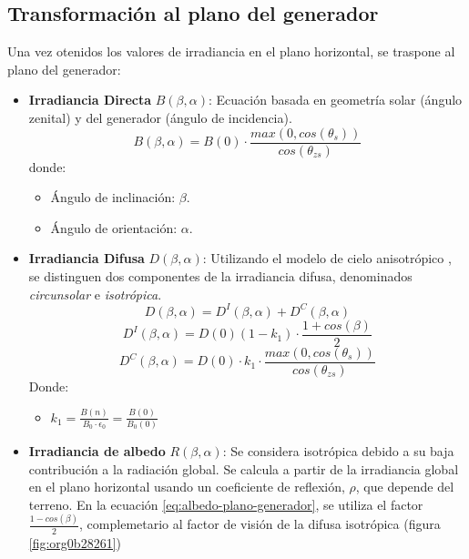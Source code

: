 \subsection{Transformación al plano del generador}
\label{sec:orge6ffc3c}
\label{subsec:transformación-plano-generador}
Una vez otenidos los valores de irradiancia en el plano horizontal, se traspone al plano del generador:
\begin{itemize}
\item \textbf{Irradiancia Directa} \(B(\beta ,\alpha)\): Ecuación basada en geometría solar (ángulo zenital) y del generador (ángulo de incidencia).
\begin{equation}
B(\beta ,\alpha)=B(0)\cdot \frac{max(0,cos(\theta_s))}{cos(\theta_{zs})}
\label{eq:irradiancia-directa-plano-generador}
\end{equation}
donde:
\begin{itemize}
\item Ángulo de inclinación: \(\beta\).
\item Ángulo de orientación: \(\alpha\). 
\end{itemize}
\item \textbf{Irradiancia Difusa} \(D(\beta ,\alpha)\): Utilizando el modelo de cielo anisotrópico \cite{Perpinan2023}, se distinguen dos componentes de la irradiancia difusa, denominados \emph{circunsolar} e \emph{isotrópica}.  
\begin{equation}
D(\beta ,\alpha)=D^I(\beta ,\alpha)+D^C(\beta ,\alpha)
\end{equation}
\begin{equation}
D^I(\beta ,\alpha)=D(0)(1-k_1)\cdot \frac{1+cos(\beta)}{2}
\end{equation}
\begin{equation}
D^C(\beta, \alpha)=D(0)\cdot k_1\cdot \frac{max(0,cos(\theta_s))}{cos(\theta_{zs})}
\end{equation}
Donde:
\begin{itemize}
\item \(k_1=\frac{B(n)}{B_0\cdot \epsilon_0}=\frac{B(0)}{B_0(0)}\)
\end{itemize}
\item \textbf{Irradiancia de albedo} \(R(\beta ,\alpha)\): Se considera isotrópica debido a su baja contribución a la radiación global. Se calcula a partir de la irradiancia global en el plano horizontal usando un coeficiente de reflexión, \(\rho\), que depende del terreno. En la ecuación \ref{eq:albedo-plano-generador}, se utiliza el factor \(\frac{1-cos(\beta)}{2}\), complemetario al factor de visión de la difusa isotrópica (figura \ref{fig:org0b28261})

\end{itemize}
